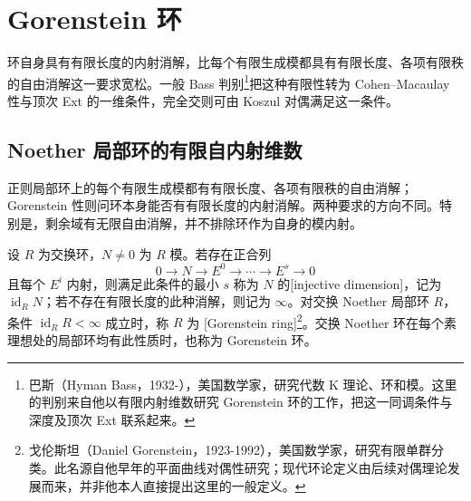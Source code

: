 
\section{Gorenstein 环}
\label{b3:sec:2203}

环自身具有有限长度的内射消解，比每个有限生成模都具有有限长度、各项有限秩的自由消解这一要求宽松。一般 Bass 判别\footnote{巴斯（Hyman Bass，1932-），美国数学家，研究代数 K 理论、环和模。这里的判别来自他以有限内射维数研究 Gorenstein 环的工作，把这一同调条件与深度及顶次 Ext 联系起来。}把这种有限性转为 Cohen–Macaulay 性与顶次 Ext 的一维条件，完全交则可由 Koszul 对偶满足这一条件。


%
%
%

\subsection{Noether 局部环的有限自内射维数}
\label{b3:subsec:2203:01}

正则局部环上的每个有限生成模都有有限长度、各项有限秩的自由消解；Gorenstein 性则问环本身能否有有限长度的内射消解。两种要求的方向不同。特别是，剩余域有无限自由消解，并不排除环作为自身的模内射。

\begin{definition}\label{b3:def:injective-dimension-gorenstein}
	设 \(R\) 为交换环，\(N\ne0\) 为 \(R\) 模。若存在正合列
	\[
		0\longrightarrow N\longrightarrow E^0\longrightarrow\cdots \longrightarrow E^s\longrightarrow0
	\]
	且每个 \(E^i\) 内射，则满足此条件的最小 \(s\) 称为 \(N\) 的[injective dimension]，记为 \(\operatorname{id}_RN\)；若不存在有限长度的此种消解，则记为 \(\infty\)。对交换 Noether 局部环 \(R\)，条件 \(\operatorname{id}_RR<\infty\) 成立时，称 \(R\) 为 [Gorenstein ring]\footnote{戈伦斯坦（Daniel Gorenstein，1923-1992），美国数学家，研究有限单群分类。此名源自他早年的平面曲线对偶性研究；现代环论定义由后续对偶理论发展而来，并非他本人直接提出这里的一般定义。}。交换 Noether 环在每个素理想处的局部环均有此性质时，也称为 Gorenstein 环。
\end{definition}

